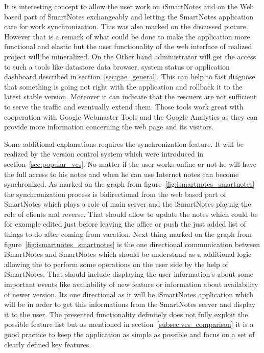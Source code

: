 It is interesting concept to allow the user work on iSmartNotes and on the Web based part of SmartNotes exchangeably  and letting the SmartNotes application care for work synchronization. This was also marked on the discussed picture. However that is a remark of what could be done to make the application more functional and elastic but the user functionality of the web interface of realized project will be mineralized. On the Other hand administrator will get the access to such a tools like datastore data browser, system status or application dashboard described in section~\ref{sec:gae_general}. This can help to fast diagnose that something is going not right with the application and rollback it to the latest stable version. Moreover  it can indicate that the rescuers are not sufficient to serve the traffic and eventually extend them. Those tools work great with cooperation with Google Webmaster Tools and the Google Analytics as they can provide more information concerning the web page and its visitors.

Some additional explanations requires the synchronization feature. It will be realized by the version control system which were introduced in section~\ref{sec:popular_vcs}. No matter if the user works online or not he will have the full access to his notes and when he can use Internet notes can become synchronized. As marked on the graph from figure~\ref{fig:ismartnotes_smartnotes} the synchronization process is bidirectional from the web based part of SmartNotes which plays a role of main server and the iSmartNotes playnig the role of clients and reverse. That should allow to update the notes which could be for example edited just before leaving the office or push the just added list of things to do after coming from vacation. Next thing marked on the graph from figure~\ref{fig:ismartnotes_smartnotes} is the one directional communication between iSmartNotes and SmartNotes which should be understand as a additional logic allowing the to perform some operations on the user side by the help of iSmartNotes. That should include displaying the user information's about some important events like availability of new feature or information about availability of newer version.  Its one directional as it will be iSmartNotes application which will be in order to get this informations from the SmartNotes server and display it to the user. The presented functionality definitely does not fully exploit the possible feature list but as mentioned in section~\ref{subsec:vcs_comparison} it is a good practice to keep the application as simple as possible and focus on a set of clearly defined key features.
